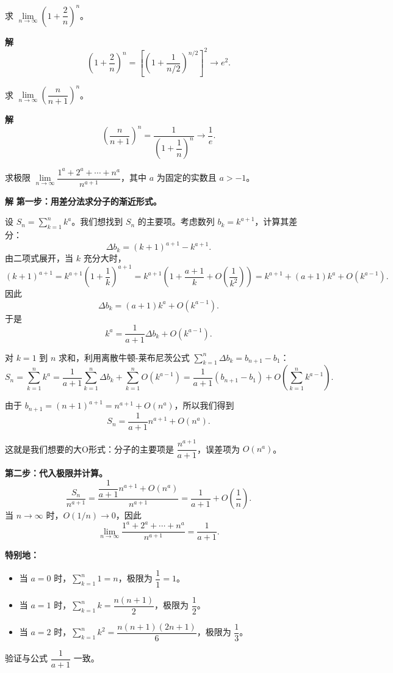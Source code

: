 \documentclass[fontset=fandol]{ctexart}
\newenvironment{custom}[1]{\par\noindent\textbf{#1}\quad}{\par\vspace{0.8em}}
\begin{document}
\begin{example}
求 \(\lim\limits_{n\to\infty} \left(1 + \dfrac{2}{n}\right)^n\)。
\end{example}
\begin{custom}{解}
\[
\left(1 + \dfrac{2}{n}\right)^n = \left[\left(1 + \dfrac{1}{n/2}\right)^{n/2}\right]^2 \to e^2.
\]
\end{custom}

\begin{example}
求 \(\lim\limits_{n\to\infty} \left(\dfrac{n}{n+1}\right)^n\)。
\end{example}
\begin{custom}{解}
\[
\left(\dfrac{n}{n+1}\right)^n = \dfrac{1}{\left(1 + \dfrac{1}{n}\right)^n} \to \dfrac{1}{e}.
\]
\end{custom}

\begin{example}求极限 \(\lim\limits_{n\to\infty} \dfrac{1^a + 2^a + \cdots + n^a}{n^{a+1}}\)，其中 \(a\) 为固定的实数且 \(a > -1\)。
\end{example}

\begin{custom}{解}
\textbf{第一步：用差分法求分子的渐近形式。}

设 \(S_n = \sum_{k=1}^n k^a\)。我们想找到 \(S_n\) 的主要项。考虑数列 \(b_k = k^{a+1}\)，计算其差分：
\[
\Delta b_k = (k+1)^{a+1} - k^{a+1}.
\]
由二项式展开，当 \(k\) 充分大时，
\[
(k+1)^{a+1} = k^{a+1} \left(1 + \dfrac{1}{k}\right)^{a+1} = k^{a+1} \left(1 + \dfrac{a+1}{k} + O\left(\dfrac{1}{k^2}\right)\right) = k^{a+1} + (a+1)k^a + O(k^{a-1}).
\]
因此
\[
\Delta b_k = (a+1)k^a + O(k^{a-1}).
\]
于是
\[
k^a = \dfrac{1}{a+1} \Delta b_k + O(k^{a-1}).
\]

对 \(k = 1\) 到 \(n\) 求和，利用离散牛顿-莱布尼茨公式 \(\sum_{k=1}^n \Delta b_k = b_{n+1} - b_1\)：
\[
S_n = \sum_{k=1}^n k^a = \dfrac{1}{a+1} \sum_{k=1}^n \Delta b_k + \sum_{k=1}^n O(k^{a-1}) = \dfrac{1}{a+1} (b_{n+1} - b_1) + O\left(\sum_{k=1}^n k^{a-1}\right).
\]

由于 \(b_{n+1} = (n+1)^{a+1} = n^{a+1} + O(n^a)\)，所以我们得到
\[
S_n = \dfrac{1}{a+1} n^{a+1} + O(n^a).
\]

这就是我们想要的大O形式：分子的主要项是 \(\dfrac{n^{a+1}}{a+1}\)，误差项为 \(O(n^a)\)。

\textbf{第二步：代入极限并计算。}
\[
\dfrac{S_n}{n^{a+1}} = \dfrac{\dfrac{1}{a+1} n^{a+1} + O(n^a)}{n^{a+1}} = \dfrac{1}{a+1} + O\left(\dfrac{1}{n}\right).
\]
当 \(n \to \infty\) 时，\(O(1/n) \to 0\)，因此
\[
\lim_{n\to\infty} \dfrac{1^a + 2^a + \cdots + n^a}{n^{a+1}} = \dfrac{1}{a+1}.
\]

\textbf{特别地：}
\begin{itemize}
\item 当 \(a = 0\) 时，\(\sum_{k=1}^n 1 = n\)，极限为 \(\dfrac{1}{1} = 1\)。
\item 当 \(a = 1\) 时，\(\sum_{k=1}^n k = \dfrac{n(n+1)}{2}\)，极限为 \(\dfrac{1}{2}\)。
\item 当 \(a = 2\) 时，\(\sum_{k=1}^n k^2 = \dfrac{n(n+1)(2n+1)}{6}\)，极限为 \(\dfrac{1}{3}\)。
\end{itemize}
验证与公式 \(\dfrac{1}{a+1}\) 一致。
\end{custom}
\end{document}
